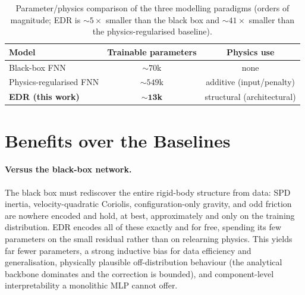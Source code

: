 \documentclass[11pt]{article}
\theoremstyle{definition}
\theoremstyle{plain}
\begin{document}
\begin{table}[t]
\centering\small
\renewcommand{\arraystretch}{1.15}
\begin{tabular}{@{}l c c@{}}
\toprule
Model & Trainable parameters & Physics use\\
\midrule
Black-box FNN & $\sim\!70$k & none\\
Physics-regularised FNN & $\sim\!549$k & additive (input/penalty)\\
\textbf{EDR (this work)} & $\bm{\sim\!13}$\textbf{k} & structural (architectural)\\
\bottomrule
\end{tabular}
\caption{Parameter/physics comparison of the three modelling paradigms (orders of
magnitude; EDR is $\sim\!5\times$ smaller than the black box and $\sim\!41\times$
smaller than the physics-regularised baseline).}
\label{tab:compare}
\end{table}

\section{Benefits over the Baselines}
\paragraph{Versus the black-box network.}
The black box must rediscover the entire rigid-body structure from data: SPD
inertia, velocity-quadratic Coriolis, configuration-only gravity, and odd friction
are nowhere encoded and hold, at best, approximately and only on the training
distribution. EDR encodes all of these exactly and for free, spending its few
parameters on the small residual rather than on relearning physics. This yields
far fewer parameters, a strong inductive bias for data efficiency and
generalisation, physically plausible off-distribution behaviour (the analytical
backbone dominates and the correction is bounded), and component-level
interpretability a monolithic MLP cannot offer.
\end{document}
